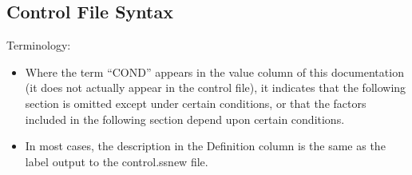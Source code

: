\subsection{Control File Syntax}

Terminology:
\begin{itemize}
	\item Where the term “COND” appears in the value column of this documentation (it does not actually appear in the control file), it indicates that the following section is omitted except under certain conditions, or that the factors included in the following section depend upon certain conditions.
	\item In most cases, the description in the Definition column is the same as the label output to the control.ss\textunderscore new file.
\end{itemize}


